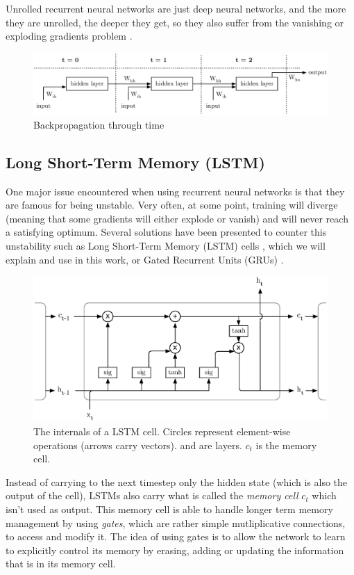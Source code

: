 Unrolled recurrent neural networks are just deep neural networks, and the
more they are unrolled, the deeper they get, so they also suffer from
the vanishing or exploding gradients problem \cite{vanishing_gradient_rnn, 
bengio94}.

\begin{figure}
	\centering
	\includegraphics[width=0.8\linewidth]{fig/bptt.eps}
	\caption{Backpropagation through time}
	\label{fig:bptt}
\end{figure}

\subsection{Long Short-Term Memory (LSTM)}
One major issue encountered when using recurrent neural networks is that they
are famous for being unstable. Very often, at some point, training will diverge
(meaning that some gradients will either explode or vanish)
and will never reach a satisfying optimum. Several solutions have been presented
to counter this unstability such as Long Short-Term Memory (LSTM)
cells \cite{lstm}, which we will explain and use in this work, or Gated
Recurrent Units (GRUs) \cite{grus}. \\

\begin{figure}
	\centering
	\includegraphics[width=0.8\linewidth]{fig/lstm.eps}
	\caption{The internals of a LSTM cell. Circles represent element-wise
	operations (arrows carry vectors).  and 
	 are layers. $c_t$ is the memory cell.}
	\label{fig:lstm}
\end{figure}

Instead of carrying to the next timestep only the hidden state (which is also
the output of the cell), LSTMs also carry what is called the
\textit{memory cell} $c_t$ which isn't used as output. This memory cell is 
able to handle longer term memory management by using \textit{gates}, which
are rather simple mutliplicative connections, to 
access and modify it. The idea of using gates is to allow the network
to learn to explicitly control its memory by erasing, adding or updating the
information that is in its memory cell.

